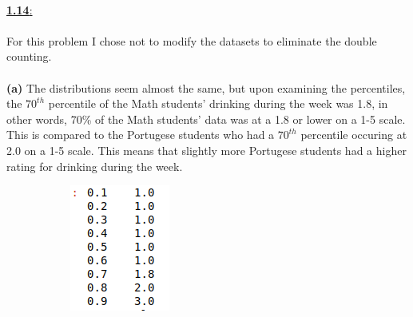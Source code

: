 \documentclass[11pt]{article}
\begin{document}
\\[20mm]
\underline{\textbf{1.14}:} \\ \\
For this problem I chose not to modify the datasets to eliminate the double counting. \\ \\
\textbf{(a)} The distributions seem almost the same, but upon examining the percentiles, the $70^{th}$ percentile of the Math students' drinking during the week was 1.8, in other words, 70\% of the Math students' data was at a 1.8 or lower on a 1-5 scale. This is compared to the Portugese students who had a $70^{th}$ percentile occuring at 2.0 on a 1-5 scale. This means that slightly more Portugese students had a higher rating for drinking during the week.
\begin{figure}[h!]
  \captionsetup{justification=centering}
  \centering
  \begin{subfigure}[b]{0.2\linewidth}
    \includegraphics[width=\linewidth]{math_hist.png}
  \end{subfigure}

\end{figure}
\end{document}
